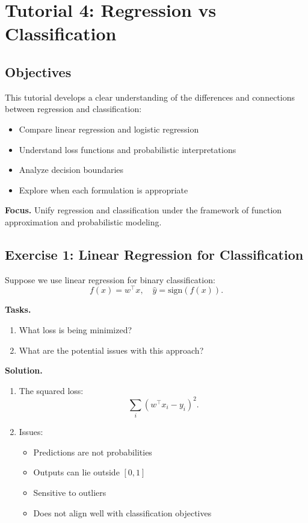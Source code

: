 \section{Tutorial 4: Regression vs Classification}

\subsection{Objectives}

This tutorial develops a clear understanding of the differences and connections between regression and classification:

\begin{itemize}
    \item Compare linear regression and logistic regression
    \item Understand loss functions and probabilistic interpretations
    \item Analyze decision boundaries
    \item Explore when each formulation is appropriate
\end{itemize}

\medskip

\noindent
\textbf{Focus.}  
Unify regression and classification under the framework of function approximation and probabilistic modeling.

\subsection{Exercise 1: Linear Regression for Classification}

Suppose we use linear regression for binary classification:
\[
f(x) = w^\top x, \quad \hat{y} = \text{sign}(f(x)).
\]

\medskip

\noindent
\textbf{Tasks.}
\begin{enumerate}
    \item What loss is being minimized?
    \item What are the potential issues with this approach?
\end{enumerate}

\medskip

\noindent
\textbf{Solution.}

\begin{enumerate}
\item The squared loss:
\[
\sum_i (w^\top x_i - y_i)^2.
\]

\item Issues:
\begin{itemize}
    \item Predictions are not probabilities
    \item Outputs can lie outside $[0,1]$
    \item Sensitive to outliers
    \item Does not align well with classification objectives
\end{itemize}
\end{enumerate}

